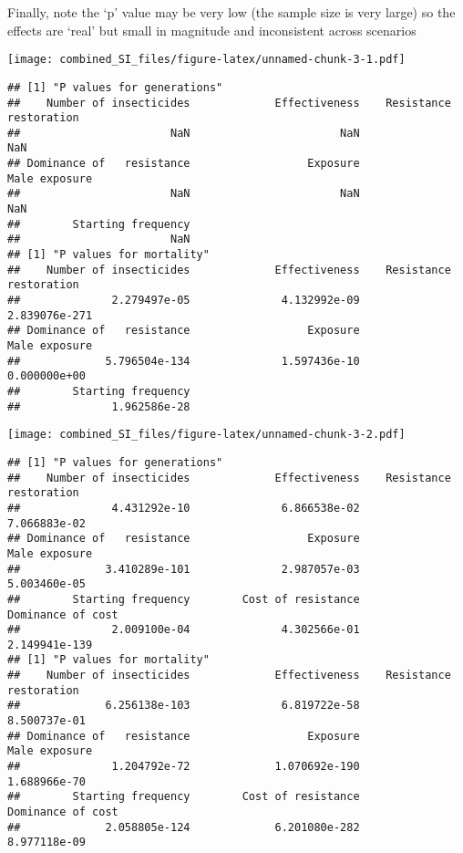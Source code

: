 \documentclass[
]{article}
\begin{document}
Finally, note the `p' value may be very low (the sample size is very
large) so the effects are `real' but small in magnitude and inconsistent
across scenarios

\pagebreak

\texttt{[image: combined\_SI\_files/figure-latex/unnamed-chunk-3-1.pdf]}

\begin{verbatim}
## [1] "P values for generations"
##    Number of insecticides             Effectiveness    Resistance restoration 
##                       NaN                       NaN                       NaN 
## Dominance of   resistance                  Exposure             Male exposure 
##                       NaN                       NaN                       NaN 
##        Starting frequency 
##                       NaN 
## [1] "P values for mortality"
##    Number of insecticides             Effectiveness    Resistance restoration 
##              2.279497e-05              4.132992e-09             2.839076e-271 
## Dominance of   resistance                  Exposure             Male exposure 
##             5.796504e-134              1.597436e-10              0.000000e+00 
##        Starting frequency 
##              1.962586e-28
\end{verbatim}

\texttt{[image: combined\_SI\_files/figure-latex/unnamed-chunk-3-2.pdf]}

\begin{verbatim}
## [1] "P values for generations"
##    Number of insecticides             Effectiveness    Resistance restoration 
##              4.431292e-10              6.866538e-02              7.066883e-02 
## Dominance of   resistance                  Exposure             Male exposure 
##             3.410289e-101              2.987057e-03              5.003460e-05 
##        Starting frequency        Cost of resistance         Dominance of cost 
##              2.009100e-04              4.302566e-01             2.149941e-139 
## [1] "P values for mortality"
##    Number of insecticides             Effectiveness    Resistance restoration 
##             6.256138e-103              6.819722e-58              8.500737e-01 
## Dominance of   resistance                  Exposure             Male exposure 
##              1.204792e-72             1.070692e-190              1.688966e-70 
##        Starting frequency        Cost of resistance         Dominance of cost 
##             2.058805e-124             6.201080e-282              8.977118e-09
\end{verbatim}
\end{document}
